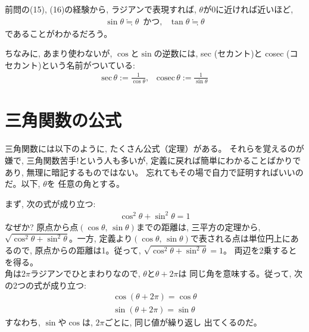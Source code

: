前問の(15), (16)の経験から, ラジアンで表現すれば, $\theta$が0に近ければ近いほど, 
\begin{eqnarray}
\sin \theta \fallingdotseq \theta \,\,\, \text{かつ, }\,\,\, \tan \theta \fallingdotseq \theta
\label{eq:sinx_x}
\end{eqnarray}
であることがわかるだろう。
\mv

ちなみに, あまり使わないが, $\cos$と$\sin$の逆数には, sec (セカント)と
cosec (コセカント)という名前がついている:
\begin{eqnarray}
\text{sec}\, \theta:=\frac{1}{\cos \theta},\,\,\,\,\,\text{cosec}\, \theta:=\frac{1}{\sin \theta}
\end{eqnarray}
\mv

\section{三角関数の公式}

三角関数には以下のように, たくさん公式（定理）がある。
それらを覚えるのが嫌で, 三角関数苦手!という人も多いが, 
定義に戻れば簡単にわかることばかりであり, 無理に暗記するものではない。
忘れてもその場で自力で証明すればいいのだ。以下, $\theta$を
任意の角とする。

まず, 次の式が成り立つ:
\begin{eqnarray}
\cos ^2 \theta + \sin ^2 \theta = 1\label{eq:trig_cos2_sin2_1}
\end{eqnarray}
なぜか? 原点から点$(\cos\theta,\, \sin\theta)$までの距離は, 
三平方の定理から, $\sqrt{\cos^2\theta+\sin^2\theta}$。一方, 
定義より$(\cos\theta,\, \sin\theta)$で表される点は単位円上にあるので, 
原点からの距離は1。従って, $\sqrt{\cos^2\theta+\sin^2\theta}=1$。
両辺を2乗するとを得る。\\

角は$2\pi$ラジアンでひとまわりなので, $\theta$と$\theta+2\pi$は
同じ角を意味する。従って, 次の2つの式が成り立つ:
\begin{eqnarray}
\cos (\theta+2\pi) = \cos \theta\label{eq:trig_sincos3_q1}\\
\sin (\theta+2\pi) = \sin \theta\label{eq:trig_sincos3_q2}
\end{eqnarray}
すなわち, $\sin$や$\cos$は, $2\pi$ごとに, 同じ値が繰り返し
出てくるのだ。\mv

